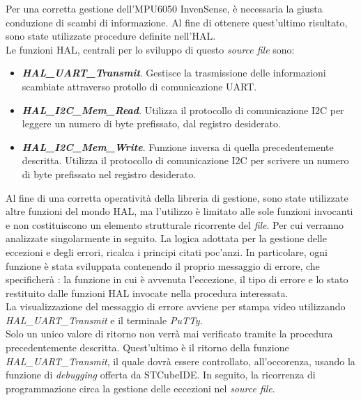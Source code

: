 \documentclass[11pt]{report}
\begin{document}
Per una corretta gestione dell'MPU6050 InvenSense, è necessaria la giusta conduzione di scambi di informazione. Al fine di ottenere quest'ultimo risultato, sono state utilizzate procedure definite nell'HAL.\\
Le funzioni HAL, centrali per lo sviluppo di questo \textit{source file} sono:
\begin{itemize}
\item \textbf{\textit{HAL\_UART\_Transmit}}. Gestisce la trasmissione delle informazioni scambiate attraverso protollo di comunicazione UART.
\item \textbf{\textit{HAL\_I2C\_Mem\_Read}}. Utilizza il protocollo di comunicazione I2C per leggere un numero di byte prefissato, dal registro desiderato.
\item \textbf{\textit{HAL\_I2C\_Mem\_Write}}. Funzione inversa di quella precedentemente descritta. Utilizza il protocollo di comunicazione I2C per scrivere un numero di byte prefissato nel registro desiderato.
\end{itemize}
Al fine di una corretta operatività della libreria di gestione, sono state utilizzate altre funzioni del mondo HAL, ma l'utilizzo è limitato alle sole funzioni invocanti e non costituiscono un elemento strutturale ricorrente del \textit{file}.
Per cui verranno analizzate singolarmente in seguito.
La logica adottata per la gestione delle eccezioni e degli errori, ricalca i principi citati poc'anzi. In particolare, ogni funzione è stata sviluppata contenendo il proprio messaggio di errore, che specificherà : la funzione in cui è avvenuta l'eccezione, il tipo di errore e lo stato restituito dalle funzioni HAL invocate nella procedura interessata.\\
La visualizzazione del messaggio di errore avviene per stampa video utilizzando\\\textit{HAL\_UART\_Transmit} e il terminale \textit{PuTTy}.\\
Solo un unico valore di ritorno non verrà mai verificato tramite la procedura precedentemente descritta. Quest'ultimo è il ritorno della funzione \textit{HAL\_UART\_Transmit}, il quale dovrà essere controllato, all'occorenza, usando la funzione di \textit{debugging} offerta da STCubeIDE.
In seguito, la ricorrenza di programmazione circa la gestione delle eccezioni nel \textit{source file}.\\

\end{document}
